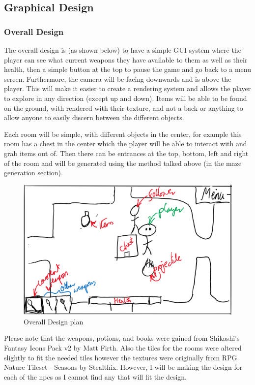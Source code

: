 \documentclass[../Main.tex]{subfiles}
\begin{document}
    \clearpage
    \subsection{Graphical Design}
        \subsubsection{Overall Design}
            The overall design is (as shown below) to have a simple GUI system where the player can see what current weapons they have available to them as well as their health, then a simple button at the top to pause the game and go back to a menu screen. Furthermore, the camera will be facing downwards and is above the player. This will make it easier to create a rendering system and allows the player to explore in any direction (except up and down). Items will be able to be found on the ground, with rendered with their texture, and not a back or anything to allow anyone to easily discern between the different objects.

            Each room will be simple, with different objects in the center, for example this room has a chest in the center which the player will be able to interact with and grab items out of. Then there can be entrances at the top, bottom, left and right of the room and will be generated using the method talked above (in the maze generation section).
            \begin{figure}[hbt!]
                \centerline{\includegraphics[scale=0.3]{img/Design/Overall Design.png}}
                \caption{Overall Design plan}
                \label{fig}
            \end{figure}

            Please note that the weapons, potions, and books were gained from Shikashi's Fantasy Icons Pack v2 by Matt Firth. Also the tiles for the rooms were altered slightly to fit the needed tiles however the textures were originally from RPG Nature Tileset - Seasons by Stealthix. However, I will be making the design for each of the npcs as I cannot find any that will fit the design.
\end{document}
